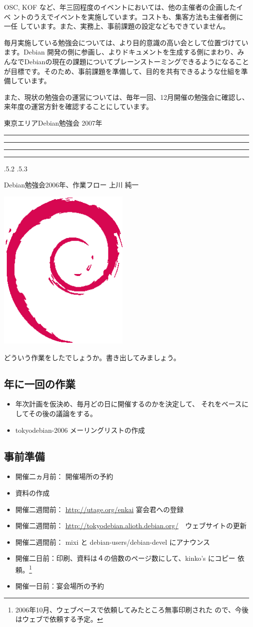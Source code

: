 \documentclass[mingoth,a4paper]{jsarticle}
\makeatletter
\newcommand{\debmtgyear}{2007}
\renewcommand{\section}{\@startsection{section}{1}{\z@}%
    {\Cvs \@plus.5\Cdp \@minus.2\Cdp}%
    {.5\Cvs \@plus.3\Cdp}%
    {\normalfont\Huge\headfont\raggedright\centering}} %
\newcommand{\dancersection}[2]{%
\newpage
東京エリアDebian勉強会 \debmtgyear{}年
\hrule
\vspace{0.5mm}
\hrule
%
\vspace{4cm}
\hrule
\vspace{0.5mm}
\hrule
%
\vspace{-7cm}
\begin{minipage}[b]{0.7\hsize}
\section{#1}
\hfill{}#2\\
\vspace{2cm}
\end{minipage}
\begin{minipage}[b]{0.3\hsize}
\hfill{}\includegraphics[height=8cm]{image200502/openlogo-nd.eps}\\
\end{minipage}
%
\vspace{-1cm}
}
\makeatother
\begin{document}
OSC, KOF など、年三回程度のイベントにおいては、他の主催者の企画したイベ
ントのうえでイベントを実施しています。コストも、集客方法も主催者側に一任
しています。また、実務上、事前課題の設定などもできていません。

毎月実施している勉強会については、より目的意識の高い会として位置づけてい
ます。Debian 開発の側に参画し、よりドキュメントを生成する側にまわり、み
んなでDebianの現在の課題についてブレーンストーミングできるようになること
が目標です。そのため、事前課題を準備して、目的を共有できるような仕組を準
備しています。

また、現状の勉強会の運営については、毎年一回、12月開催の勉強会に確認し、
来年度の運営方針を確認することにしています。


\dancersection{Debian勉強会2006年、作業フロー}{上川 純一}
\label{sec:debmtg2006flow}

どういう作業をしたでしょうか。書き出してみましょう。

\subsection{年に一回の作業}

\begin{itemize}
 \item 年次計画を仮決め、毎月どの日に開催するのかを決定して、
       それをベースにしてその後の議論をする。
 \item tokyodebian-2006 メーリングリストの作成
\end{itemize}

\subsection{事前準備}

\begin{itemize}
 \item 開催二ヵ月前： 開催場所の予約
 \item 資料の作成
 \item 開催二週間前： \url{http://utage.org/enkai} 宴会君への登録
 \item 開催二週間前： \url{http://tokyodebian.alioth.debian.org/}　ウェブサイトの更新
 \item 開催二週間前： mixi と debian-users/debian-devel にアナウンス
 \item 開催二日前：印刷、資料は４の倍数のページ数にして、kinko's にコピー
       依頼。\footnote{2006年10月、ウェブベースで依頼してみたところ無事印刷された
       ので、今後はウェブで依頼する予定。}
 \item 開催一日前：宴会場所の予約
\end{itemize}
\end{document}

